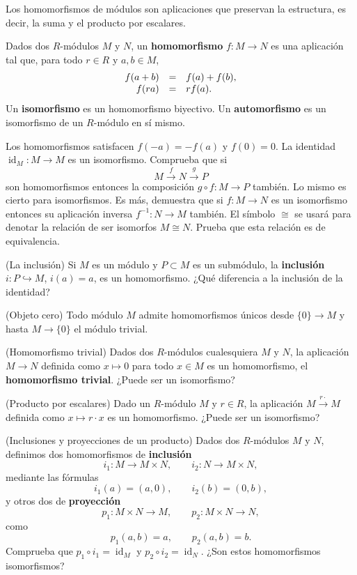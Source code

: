 Los homomorfismos de módulos son aplicaciones que preservan la
estructura, es decir, la suma y el producto por escalares.


Dados dos \(R\)-módulos \(M\) y \(N\), un \textbf{homomorfismo}
\(f\colon M\rightarrow N\) es una aplicación tal que, para todo
\(r\in R\) y \(a,b\in M\),
\[\begin{array}{rcl} f(a+b)&=&f(a)+f(b),\cr f(ra)&=&rf(a).\end{array}\]
Un \textbf{isomorfismo} es un homomorfismo biyectivo. Un
\textbf{automorfismo} es un isomorfismo de un \(R\)-módulo en sí mismo.


Los homomorfismos satisfacen \(f(-a)=-f(a)\) y \(f(0)=0\). La identidad
\(\operatorname{id}_M\colon M\rightarrow M\) es un isomorfismo.
Comprueba que si
\[M\stackrel{f}\longrightarrow N\stackrel{g}\longrightarrow P\] son
homomorfismos entonces la composición \(g\circ f\colon M\rightarrow P\)
también. Lo mismo es cierto para isomorfismos. Es más, demuestra que si
\(f\colon M\rightarrow N\) es un isomorfismo entonces su aplicación
inversa \(f^{-1}\colon N\rightarrow M\) también. El símbolo \(\cong\) se
usará para denotar la relación de ser isomorfos \(M\cong N\). Prueba que
esta relación es de equivalencia. 

\textrm{\normalfont (La inclusión)} Si \(M\) es un módulo
y \(P\subset M\) es un submódulo, la \textbf{inclusión}
\(i\colon P\hookrightarrow M\), \(i(a)=a\), es un homomorfismo. ¿Qué
diferencia a la inclusión de la identidad? 

\textrm{\normalfont (Objeto cero)} Todo módulo \(M\)
admite homomorfismos únicos desde \(\{0\}\rightarrow M\) y hasta
\(M\rightarrow \{0\}\) el módulo trivial. 

\textrm{\normalfont (Homomorfismo trivial)} Dados dos
\(R\)-módulos cualesquiera \(M\) y \(N\), la aplicación
\(M\rightarrow N\) definida como \(x\mapsto 0\) para todo \(x\in M\) es
un homomorfismo, el \textbf{homomorfismo trivial}. ¿Puede ser un
isomorfismo? 

\textrm{\normalfont (Producto por escalares)} Dado un
\(R\)-módulo \(M\) y \(r\in R\), la aplicación
\(M\stackrel{r\cdot}\rightarrow M\) definida como \(x\mapsto r\cdot x\)
es un homomorfismo. ¿Puede ser un isomorfismo? 

\textrm{\normalfont (Inclusiones y proyecciones de un producto)}
Dados dos \(R\)-módulos \(M\) y \(N\), definimos dos homomorfismos de
\textbf{inclusión}
\[i_1\colon M\longrightarrow M\times N,\qquad i_2\colon N\longrightarrow M\times N,\]
mediante las fórmulas \[i_1(a)=(a,0),\qquad i_2(b)=(0,b),\] y otros
dos de \textbf{proyección}
\[p_1\colon M\times N\longrightarrow M,\qquad p_2\colon M\times N\longrightarrow N,\]
como \[p_1(a,b)=a,\qquad p_2(a,b)=b.\] Comprueba que
\(p_1\circ i_1=\operatorname{id}_M\) y
\(p_2\circ i_2=\operatorname{id}_N\). ¿Son estos homomorfismos
isomorfismos? 


